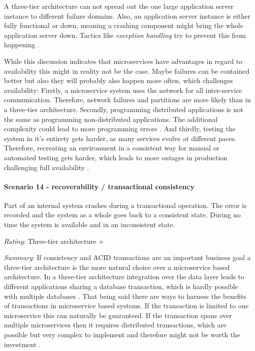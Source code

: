 A three-tier architecture can not spread out the one large application server instance to different failure domains.
Also, an application server instance is either fully functional or down, meaning a crashing component might bring the whole application server down.
Tactics like \textit{exception handling} try to prevent this from happening \citep[p. 90]{Bass2012}.

While this discussion indicates that microservices have advantages in regard to availability this might in reality not be the case.
Maybe failures can be contained better but also they will probably also happen more often, which challenges availability:
Firstly, a microservice system uses the network for all inter-service communication.
Therefore, network failures and partitions are more likely than in a three-tier architecture.
Secondly, programming distributed applications is not the same as programming non-distributed applications.
The additional complexity could lead to more programming errors \citep[p. 5]{Kendall1994}.
And thirdly, testing the system in it's entirety gets harder, as many services evolve at different paces.
Therefore, recreating an environment in a consistent way for manual or automated testing gets harder, which leads to more outages in production challenging full availability \cite{Hoff2014}.

\paragraph{Scenario 14 -  recoverability / transactional consistency}
Part of an internal system crashes during a transactional operation. The error is recorded and the system as a whole goes back to a consistent state. During no time the system is available and in an inconsistent state.
\label{quaMicro:s14}

\textit{Rating}: Three-tier architecture +

\textit{Summary}:
If consistency and ACID transactions are an important business goal a three-tier architecture is the more natural choice over a microservice based architecture.
In a three-tier architecture integration over the data layer leads to different applications sharing a database transaction, which is hardly possible with multiple databases \cite{FowlerDecentralizedData2014}.
That being said there are ways to harness the benefits of transactions in microservice based systems.
If the transaction is limited to one microservice this can naturally be guaranteed.
If the transaction spans over multiple microservices then it requires distributed transactions, which are possible but very complex to implement and therefore might not be worth the investment \citep[p. 92]{Newman2015}.

